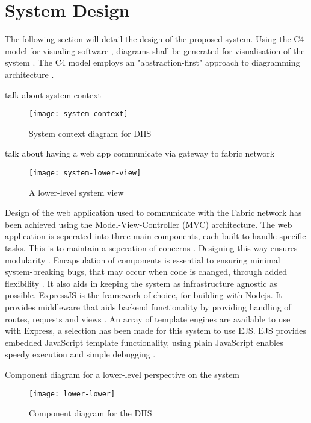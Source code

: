 \section{System Design}

The following section will detail the design of the proposed system.
Using the C4 model for visualing software \cite{noauthor_c4_nodate}, diagrams shall be generated for visualisation of the system \label{appendix:c4plantuml}.
The C4 model employs an "abstraction-first" approach to diagramming architecture \cite{noauthor_c4_nodate}. 


talk about system context 
\begin{figure}[H]
  \texttt{[image: system-context]}
  \caption{System context diagram for DIIS}
\end{figure}


talk about having a web app communicate via gateway to fabric network
\begin{figure}[H]
  \texttt{[image: system-lower-view]}
  \caption{A lower-level system view}
\end{figure}

Design of the web application used to communicate with the Fabric network has been achieved using the Model-View-Controller (MVC) architecture. 
The web application is seperated into three main components, each built to handle specific tasks. 
This is to maintain a seperation of concerns \cite{richards_software_2015}.
Designing this way ensures modularity \cite{laplante_what_2007}.
Encapsulation of components is essential to ensuring minimal system-breaking bugs, that may occur when code is changed, through added flexibility \cite{application_2001}.
It also aids in keeping the system as infrastructure agnostic as possible.
ExpressJS is the framework of choice, for building with Nodejs. 
It provides middleware that aids backend functionality by providing handling of routes, requests and views \cite{noauthor_express_nodate}.
An array of template engines are available to use with Express, a selection has been made for this system to use EJS.
EJS provides embedded JavaScript template functionality, using plain JavaScript enables speedy execution and simple debugging \cite{noauthor_ejs_nodate}.

Component diagram for a lower-level perspective on the system
\begin{figure}[H]
  \texttt{[image: lower-lower]}
  \caption{Component diagram for the DIIS}
\end{figure}



